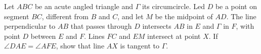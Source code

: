 Let $ABC$ be an acute angled triangle and $\Gamma$ its circumcircle. Led $D$ be a point on segment $BC$,  different from $B$ and $C$,  and let $M$ be the midpoint of $AD$. The line perpendicular to $AB$ that passes through $D$ intersects $AB$ in $E$ and $\Gamma$ in $F$,  with point $D$ between $E$ and $F$. Lines $FC$ and $EM$ intersect at point $X$. If $\angle DAE = \angle AFE$,  show that line $AX$ is tangent to $\Gamma$.